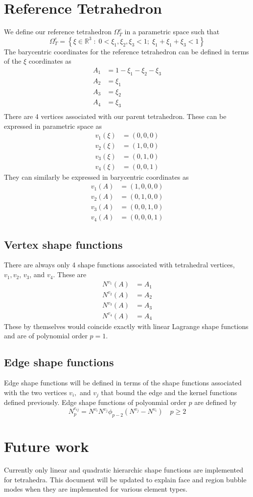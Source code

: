 \documentclass{article}
\begin{document}
\section{Reference Tetrahedron}

We define our reference tetrahedron $\Omega^e_T$ in a parametric space
such that
\[
\Omega^e_T = \left\{ \xi \in \mathbb{R}^3 \; : \;
0 < \xi_1, \xi_2, \xi_3 < 1; \; \xi_1 + \xi_1 + \xi_3 < 1 \right\}
\]
The barycentric coordinates for the reference tetrahedron can be defined in
terms of the $\xi$ coordinates as
\begin{align*}
A_1 &= 1 - \xi_1 - \xi_2 - \xi_3 \\
A_2 &= \xi_1 \\
A_3 &= \xi_2 \\
A_4 &= \xi_3 \\
\end{align*}
There are 4 vertices associated with our parent tetrahedron. These can be
expressed in parametric space as
\begin{align*}
v_1(\xi) &= (0,0,0) \\
v_2(\xi) &= (1,0,0) \\
v_3(\xi) &= (0,1,0) \\
v_4(\xi) &= (0,0,1)
\end{align*}
They can similarly be expressed in barycentric coordinates as
\begin{align*}
v_1(A) &= (1,0,0,0) \\
v_2(A) &= (0,1,0,0) \\
v_3(A) &= (0,0,1,0) \\
v_4(A) &= (0,0,0,1)
\end{align*}

\subsection{Vertex shape functions}

There are always only 4 shape functions associated with tetrahedral vertices, 
$v_1, v_2$, $v_3$, and $v_4$.
These are
\begin{align*}
N^{v_1}(A) &= A_1 \\
N^{v_2}(A) &= A_2 \\
N^{v_3}(A) &= A_3 \\
N^{v_4}(A) &= A_4
\end{align*}
These by themselves would coincide exactly with linear Lagrange shape
functions and are of polynomial order $p=1$.

\subsection{Edge shape functions}
Edge shape functions will be defined in terms of the shape functions
associated with the two vertices $v_i,$ and $v_j$ that bound the edge and the
kernel functions defined previously. Edge shape functions of polyonmial order
$p$ are defined by
\[
N^{e_{ij}}_p = N^{v_i} N^{v_j} \phi_{p-2}(N^{v_j} - N^{v_i})
\quad p \geq 2
\]

\section{Future work}
Currently only linear and quadratic hierarchic shape functions are
implemented for tetrahedra. This document will be updated to explain face
and region bubble modes when they are implemented for various element types.
\end{document}
